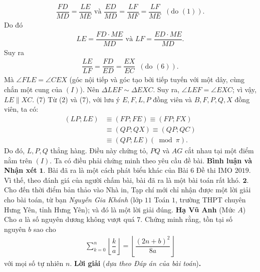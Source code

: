 \begin{multicols}{2}
\begin{align*}
		\dfrac{{FD}}{{MD}} \!=\! \dfrac{{LE}}{{ME}} \text{ và } \dfrac{{ED}}{{MD}} \!=\! \dfrac{{LF}}{{MF}} \!=\! \dfrac{{LF}}{{ME}}\,\,\,({\text{do }}(1)).
	\end{align*} 
	Do đó
	\begin{align*}
		LE = \dfrac{{FD \cdot ME}}{{MD}} \text{ và } LF = \dfrac{{ED \cdot ME}}{{MD}}.
	\end{align*}
	Suy ra
	\begin{align*}
		\dfrac{{LE}}{{LF}} = \dfrac{{FD}}{{ED}} = \dfrac{{EX}}{{EC}}\,\,\,({\text{do }}(6)).
	\end{align*}
	Mà $\angle FLE = \angle CEX$ (góc nội tiếp và góc tạo bởi tiếp tuyến với một dây, cùng chắn một cung của $(I)$).
	\vskip 0.05cm
	Nên $\Delta LEF \sim \Delta EXC$. Suy ra, $\angle LEF = \angle EXC$; vì vậy, $LE \parallel XC$. \hfill ($7$)
	\vskip 0.05cm
	Từ ($2$) và ($7$), với lưu ý $E, F, L, P$ đồng viên và $B, F, P, Q, X$ đồng viên, ta có:
	\begin{align*}
		\left( {LP;LE} \right) &\equiv \left( {FP;FE} \right) \equiv \left( {FP;FX} \right) \\[-0.5ex]
		&\equiv \left( {QP;QX} \right) \equiv \left( {QP;QC} \right) \\[-0.5ex]
		&\equiv \left( {QP;LE} \right)\left( {\bmod \pi } \right).
	\end{align*}
	Do đó, $L, P, Q$ thẳng hàng. Điều này chứng tỏ, $PQ$ và $AG$ cắt nhau tại một điểm nằm trên $(I)$.
	\vskip 0.05cm
	Ta có điều phải chứng minh theo yêu cầu đề bài.
	\vskip 0.05cm
	\textbf{\color{thachthuctoanhoc}Bình luận và Nhận xét}
	\vskip 0.05cm
	$\pmb{1.}$ Bài đã ra là một cách phát biểu khác của Bài $6$ Đề thi IMO $2019$. Vì thế, theo đánh giá của người chấm bài, bài đã ra là một bài toán rất khó.
	\vskip 0.05cm
	$\pmb{2.}$ Cho đến thời điểm bản thảo vào Nhà in, Tạp chí mới chỉ nhận được một lời giải cho bài toán, từ bạn \textit{Nguyễn Gia Khánh} (lớp $11$ Toán $1$, trường THPT chuyên Hưng Yên, tỉnh Hưng Yên); và đó là một lời giải đúng.
	\vskip 0.2cm
	\hfill	\textbf{\color{thachthuctoanhoc}Hạ Vũ Anh}
	\vskip 0.01cm
	\columnbreak
	{}
	(Mức $A$) Cho $a$ là số nguyên dương không vượt quá $7$. Chứng minh rằng, tồn tại số nguyên $b$ sao cho
	\begin{align*}
		\sum\limits_{k=0}^n\left\lfloor\dfrac ka\right\rfloor=\left\lfloor\dfrac {(2n+b)^2}{8a}\right\rfloor
	\end{align*}
	với mọi số tự nhiên $n$.
	\vskip 0.05cm
	\textbf{\color{thachthuctoanhoc}Lời giải} (\textit{dựa theo Đáp án của bài toán})\textbf{\color{thachthuctoanhoc}.}

\end{multicols}
